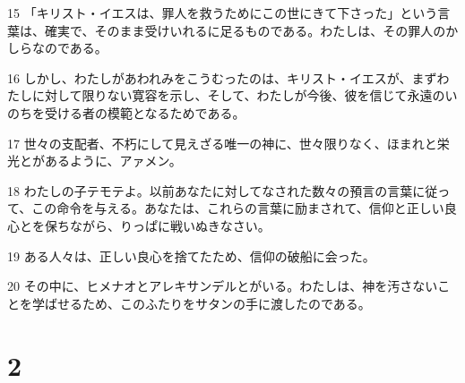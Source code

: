 \par 15 「キリスト・イエスは、罪人を救うためにこの世にきて下さった」という言葉は、確実で、そのまま受けいれるに足るものである。わたしは、その罪人のかしらなのである。
\par 16 しかし、わたしがあわれみをこうむったのは、キリスト・イエスが、まずわたしに対して限りない寛容を示し、そして、わたしが今後、彼を信じて永遠のいのちを受ける者の模範となるためである。
\par 17 世々の支配者、不朽にして見えざる唯一の神に、世々限りなく、ほまれと栄光とがあるように、アァメン。
\par 18 わたしの子テモテよ。以前あなたに対してなされた数々の預言の言葉に従って、この命令を与える。あなたは、これらの言葉に励まされて、信仰と正しい良心とを保ちながら、りっぱに戦いぬきなさい。
\par 19 ある人々は、正しい良心を捨てたため、信仰の破船に会った。
\par 20 その中に、ヒメナオとアレキサンデルとがいる。わたしは、神を汚さないことを学ばせるため、このふたりをサタンの手に渡したのである。

\chapter{2}


